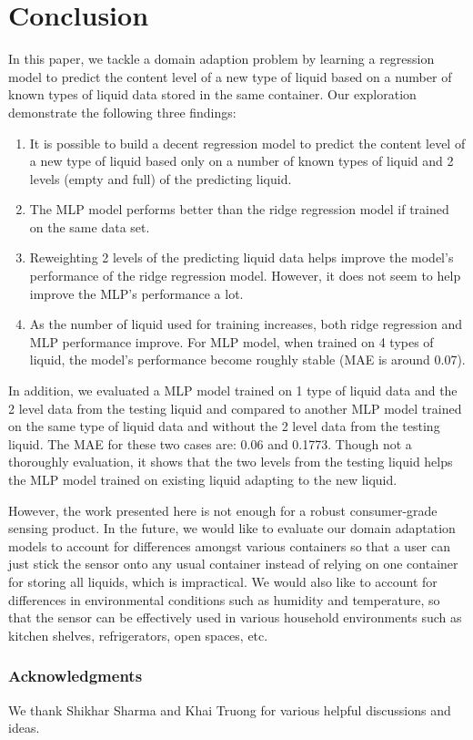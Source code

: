 \documentclass{article} %
\begin{document}
\section{Conclusion}
In this paper, we tackle a domain adaption problem by learning a regression model to predict the content level of a new type of liquid based on a number of known types of liquid data stored in the same container. Our exploration demonstrate the following three findings: 
\begin{enumerate}
\item It is possible to build a decent regression model to predict the content level of a new type of liquid based only on a number of known types of liquid and 2 levels (empty and full) of the predicting liquid.

\item The MLP model performs better than the ridge regression model if trained on the same data set.

\item Reweighting 2 levels of the predicting liquid data helps improve the model's performance of the ridge regression model. However, it does not seem to help improve the MLP's performance a lot.

\item As the number of liquid used for training increases, both ridge regression and MLP performance improve. For MLP model, when trained on 4 types of liquid, the model's performance become roughly stable (MAE is around 0.07).
\end{enumerate}

In addition, we evaluated a MLP model trained on 1 type of liquid data and the 2 level data from the testing liquid and compared to another MLP model trained on the same type of liquid data and without the 2 level data from the testing liquid. The MAE for these two cases are: 0.06 and 0.1773. Though not a thoroughly evaluation, it shows that the two levels from the testing liquid helps the MLP model trained on existing liquid adapting to the new liquid.  

However, the work presented here is not enough for a robust consumer-grade sensing product. In the future, we would like to evaluate our domain adaptation models to account for differences amongst various containers so that a user can just stick the sensor onto any usual container instead of relying on one container for storing all liquids, which is impractical. We would also like to account for differences in environmental conditions such as humidity and temperature, so that the sensor can be effectively used in various household environments such as kitchen shelves, refrigerators, open spaces, etc.

\subsubsection*{Acknowledgments}
We thank Shikhar Sharma and Khai Truong for various helpful discussions and ideas.




\end{document}
